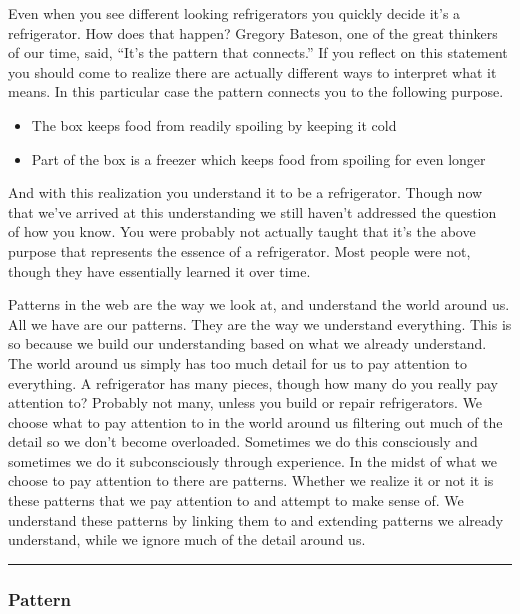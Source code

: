 \documentclass[]{memoir}
\begin{document}
Even when you see different looking refrigerators you quickly decide
it's a refrigerator. How does that happen? Gregory Bateson, one of the
great thinkers of our time, said, ``It's the pattern that connects.'' If
you reflect on this statement you should come to realize there are
actually different ways to interpret what it means. In this particular
case the pattern connects you to the following purpose.

\begin{itemize}
\itemsep1pt\parskip0pt
\item
  The box keeps food from readily spoiling by keeping it cold
\item
  Part of the box is a freezer which keeps food from spoiling for even
  longer
\end{itemize}

And with this realization you understand it to be a refrigerator. Though
now that we've arrived at this understanding we still haven't addressed
the question of how you know. You were probably not actually taught that
it's the above purpose that represents the essence of a refrigerator.
Most people were not, though they have essentially learned it over time.

Patterns in the web are the way we look at, and understand the world
around us. All we have are our patterns. They are the way we understand
everything. This is so because we build our understanding based on what
we already understand. The world around us simply has too much detail
for us to pay attention to everything. A refrigerator has many pieces,
though how many do you really pay attention to? Probably not many,
unless you build or repair refrigerators. We choose what to pay
attention to in the world around us filtering out much of the detail so
we don't become overloaded. Sometimes we do this consciously and
sometimes we do it subconsciously through experience. In the midst of
what we choose to pay attention to there are patterns. Whether we
realize it or not it is these patterns that we pay attention to and
attempt to make sense of. We understand these patterns by linking them
to and extending patterns we already understand, while we ignore much of
the detail around us.

\begin{center}\rule{3in}{0.4pt}\end{center}

\subsubsection{Pattern}
\end{document}
